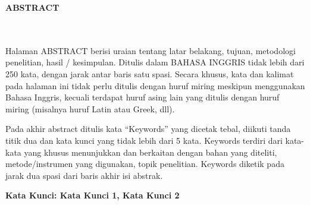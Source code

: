 \clearpage
{}%
\thispagestyle{fancy}

\begin{center}
	\large \bfseries \MakeUppercase{Abstract}\\
	\normalsize \normalfont {\thetitleEN}\\
	\normalsize \normalfont {\theauthor}\\
	\bigskip
	
	\normalsize \normalfont \justifying \singlespacing
	Halaman ABSTRACT berisi uraian tentang latar belakang, tujuan, metodologi penelitian, hasil / kesimpulan. Ditulis dalam BAHASA INGGRIS tidak lebih dari 250 kata, dengan jarak antar baris satu spasi. Secara khusus, kata dan kalimat pada halaman ini tidak perlu ditulis dengan huruf miring meskipun menggunakan Bahasa Inggris, kecuali terdapat huruf asing lain yang ditulis dengan huruf miring (misalnya huruf Latin atau Greek, dll). \par
	
	Pada akhir abstract ditulis kata “Keywords” yang dicetak tebal, diikuti tanda titik dua dan kata kunci yang tidak lebih dari 5 kata. Keywords terdiri dari kata-kata yang khusus menunjukkan dan berkaitan dengan bahan yang diteliti, metode/instrumen yang digunakan, topik penelitian. Keywords diketik pada jarak dua spasi dari baris akhir isi abstrak.\par
	
	\textbf{Kata Kunci: Kata Kunci 1, Kata Kunci 2}
	
	\vfill
	
\end{center}
\clearpage